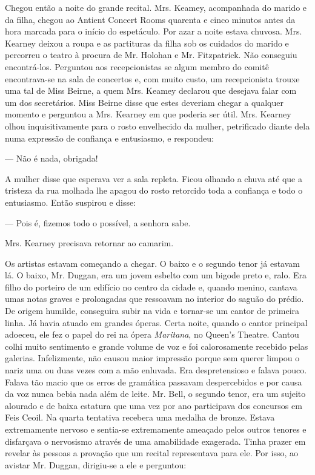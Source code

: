 Chegou então a noite do grande recital. Mrs. Keamey, acompanhada do
marido e da filha, chegou ao Antient Concert Rooms quarenta e cinco
minutos antes da hora marcada para o início do espetáculo. Por azar a
noite estava chuvosa. Mrs. Kearney deixou a roupa e as partituras da
filha sob os cuidados do marido e percorreu o teatro à procura de Mr.
Holohan e Mr. Fitzpatrick. Não conseguiu encontrá-los. Perguntou aos
recepcionistas se algum membro do comitê encontrava-se na sala de
concertos e, com muito custo, um recepcionista trouxe uma tal de Miss
Beirne, a quem Mrs. Keamey declarou que desejava falar com um dos
secretários. Miss Beirne disse que estes deveriam chegar a qualquer
momento e perguntou a Mrs. Kearney em que poderia ser útil. Mrs.
Kearney olhou inquisitivamente para o rosto envelhecido da mulher,
petrificado diante dela numa expressão de confiança e entusiasmo, e
respondeu:

--- Não é nada, obrigada!

A mulher disse que esperava ver a sala repleta. Ficou olhando a chuva
até que a tristeza da rua molhada lhe apagou do rosto
retorcido toda a confiança e todo o entusiasmo. Então suspirou e
disse:

--- Pois é, fizemos todo o possível, a senhora sabe.

Mrs. Kearney precisava retornar ao camarim.

Os artistas estavam começando a chegar. O baixo e o segundo tenor já
estavam lá. O baixo, Mr. Duggan, era um jovem esbelto com um bigode
preto e, ralo. Era filho do porteiro de um edifício no centro da
cidade e, quando menino, cantava umas notas graves e prolongadas que
ressoavam no interior do saguão do prédio. De origem humilde,
conseguira subir na vida e tornar-se um cantor de primeira linha. Já
havia atuado em grandes óperas. Certa noite, quando o cantor
principal adoeceu, ele fez o papel do rei na ópera \textit{Maritana}, no
Queen's Theatre. Cantou colhi muito sentimento e grande volume de voz
e foi calorosamente recebido pelas galerias. Infelizmente, não causou
maior impressão porque sem querer limpou o nariz uma ou duas vezes com
a mão enluvada. Era despretensioso e falava pouco. Falava tão macio
que os erros de gramática passavam despercebidos e por causa da voz
nunca bebia nada além de leite. Mr. Bell, o segundo tenor, era um
sujeito alourado e de baixa estatura que uma vez por ano participava
dos concursos em Feis Ceoil. Na quarta tentativa recebera uma
medalha de bronze. Estava extremamente nervoso e sentia-se
extremamente ameaçado pelos outros tenores e disfarçava o
nervosismo através de uma amabilidade exagerada. Tinha prazer em
revelar às pessoas a provação que um recital representava para ele.
Por isso, ao avistar Mr. Duggan, dirigiu-se a ele e perguntou:


